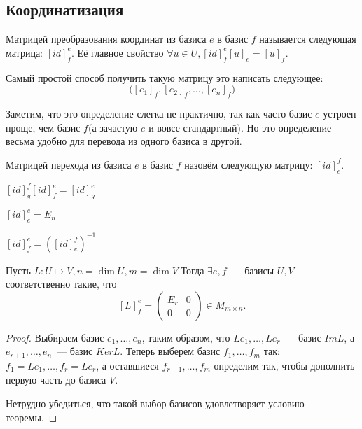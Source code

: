 \subsection{Координатизация}
\begin{definition}
    Матрицей преобразования координат из базиса $e$ в базис $f$ называется следующая матрица:
    $[id]^e_f$. Её главное свойство  $\forall u\in U, [id]^e_f[u]_e = [u]_f$.
\end{definition}
\begin{remark}
    Самый простой способ получить такую матрицу это написать
    следующее: $$\Big([e_1]_f,[e_2]_f,\dots,[e_n]_f\Big)$$
\end{remark}
\begin{motivation}
    Заметим, что это определение слегка не практично, так как часто базис $e$
    устроен проще, чем базис $f$(а зачастую $e$ и вовсе стандартный). 
    Но это определение весьма удобно для перевода из одного базиса в другой.
\end{motivation}
\begin{definition}
    Матрицей перехода из базиса $e$ в базис $f$ назовём следующую матрицу:
    $[id]^f_e$.
\end{definition}
\begin{properties}
    \item $[id]^f_g[id]^e_f = [id]^e_g$
    \item $[id]^e_e = E_n$ 
    \item $[id]^e_f=([id]^f_e)^{-1}$
\end{properties}
\begin{theorem}
    Пусть $L: U\mapsto V, n = \dim U, m = \dim V$ 
    Тогда $\exists e, f$~--- базисы $U,V$ соответственно такие, что
    \[
    [L]^e_f = 
    \left(\begin{array}{c|c}
        E_r & 0\\
        \hline
        0 & 0
    \end{array}\right)\in M_{m\times n}
    .\] 
\end{theorem}
\begin{proof}
    Выбираем базис $e_1,\dots, e_n$, таким образом, что $Le_1,\dots,Le_r$~--- базис $Im L$,
    а $e_{r+1},\dots, e_n$~--- базис $Ker L$. Теперь выберем базис $f_1,\dots, f_m$ так:
    $f_1 = Le_1,\dots, f_r = Le_r$, а оставшиеся $f_{r+1},\dots, f_m$ определим так,
    чтобы дополнить первую часть до базиса $V$. 

    Нетрудно убедиться, что такой выбор базисов удовлетворяет условию теоремы.
\end{proof}
